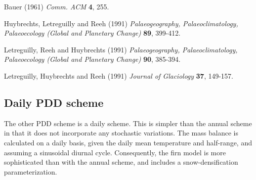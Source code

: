 \noindent Bauer (1961) \emph{Comm. ACM} \textbf{4}, 255.

\noindent Huybrechts, Letreguilly and Reeh (1991) \emph{Palaeogeography,
Palaeoclimatology, Palaeoecology (Global and Planetary Change)}
\textbf{89}, 399-412.

\noindent Letreguilly, Reeh and  Huybrechts (1991) \emph{Palaeogeography,
Palaeoclimatology, Palaeoecology (Global and Planetary Change)}
\textbf{90}, 385-394.

\noindent Letreguilly, Huybrechts  and  Reeh (1991) \emph{Journal of
Glaciology} \textbf{37}, 149-157.
%
%
\subsection{Daily PDD scheme}
\label{ug.mbal.daily_pdd_scheme}
The other PDD scheme is a daily scheme. This is simpler than the annual scheme in that it does not incorporate any stochastic variations. The mass balance is calculated on a daily basis, given the daily mean temperature and half-range, and assuming a sinusoidal diurnal cycle. Consequently, the firn model is more sophisticated than with the annual scheme, and includes a snow-densification parameterization.
%
